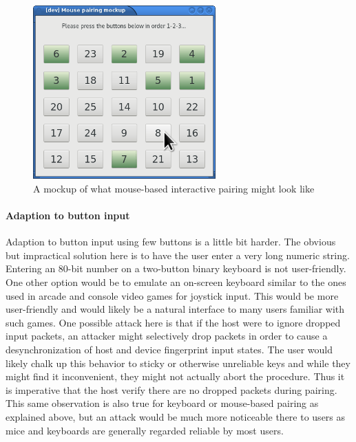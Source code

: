 \documentclass[12pt,a4paper,notitlepage]{article}
\begin{document}
\begin{figure}[h]
    \centering
    \includegraphics[width=7cm]{mouse_mockup.png}
    \caption{A mockup of what mouse-based interactive pairing might look like}
    \label{mouse_mockup}
\end{figure}

\paragraph{Adaption to button input}
Adaption to button input using few buttons is a little bit harder. The obvious but impractical solution here is to have
the user enter a very long numeric string. Entering an 80-bit number on a two-button binary keyboard is not
user-friendly. One other option would be to emulate an on-screen keyboard similar to the ones used in arcade and console
video games for joystick input. This would be more user-friendly and would likely be a natural interface to many users
familiar with such games. One possible attack here is that if the host were to ignore dropped input packets, an attacker
might selectively drop packets in order to cause a desynchronization of host and device fingerprint input states. The
user would likely chalk up this behavior to sticky or otherwise unreliable keys and while they might find it
inconvenient, they might not actually abort the procedure. Thus it is imperative that the host verify there are no
dropped packets during pairing. This same observation is also true for keyboard or mouse-based pairing as explained
above, but an attack would be much more noticeable there to users as mice and keyboards are generally regarded reliable
by most users.
\end{document}
